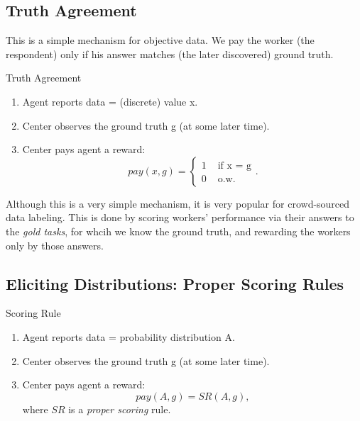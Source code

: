 \documentclass{report}
\theoremstyle{definition}
\begin{document}
\subsection{Truth Agreement}
This is a simple mechanism for objective data. We pay the worker (the respondent) only if his answer matches (the later discovered) ground truth.

\begin{algorithm}
    \caption{Truth Agreement}
    \label{alg:truth_agreement}
    \begin{enumerate}
        \item Agent reports data = (discrete) value x.
        \item Center observes the ground truth g (at some later time).
        
        \item{Center pays agent a reward:
        \begin{equation*}
            pay(x, g)=
            \begin{cases}
                 1 &\text{ if x = g}\\
                 0 &\text{ o.w.}
            \end{cases}.
        \end{equation*}}
    \end{enumerate}
\end{algorithm}

Although this is a very simple mechanism, it is very popular for crowd-sourced data labeling. This is done by scoring workers' performance via their answers to the \emph{gold tasks}, for whcih we know the ground truth, and rewarding the workers only by those answers.

\subsection{Eliciting Distributions: Proper Scoring Rules}
\label{sec:proper}

\begin{algorithm}[b]
    \caption{Scoring Rule}
    \label{alg:scoring_rule}
    \begin{enumerate}
        \item Agent reports data = probability distribution A.
        \item Center observes the ground truth g (at some later time).
        
        \item{Center pays agent a reward:
        \begin{equation*}
            pay(A, g)= SR(A, g),
        \end{equation*}}
        where $SR$ is a \emph{proper scoring} rule.
    \end{enumerate}
\end{algorithm}
\end{document}
